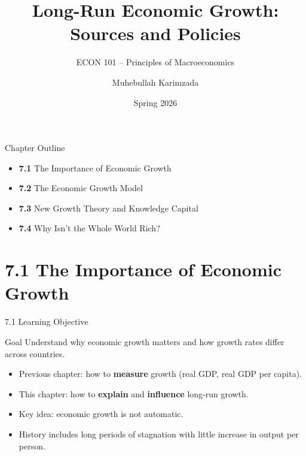 \documentclass[aspectratio=169]{beamer}
\title{\textbf{Long-Run Economic Growth: Sources and Policies}}
\subtitle{{\large ECON 101 -- Principles of Macroeconomics}}
\author{Muhebullah Karimzada}
\date{Spring 2026}
\begin{document}

\begin{frame}[plain]
  \titlepage
\end{frame}

\begin{frame}{Chapter Outline}
\transfade
\begin{itemize}[<+->]
  \item \textbf{7.1} The Importance of Economic Growth
  \item \textbf{7.2} The Economic Growth Model
  \item \textbf{7.3} New Growth Theory and Knowledge Capital
  \item \textbf{7.4} Why Isn't the Whole World Rich?
\end{itemize}
\end{frame}

\section{7.1 The Importance of Economic Growth}

\begin{frame}{7.1 Learning Objective}
\transfade
\begin{block}{Goal}
Understand why economic growth matters and how growth rates differ across countries.
\end{block}
\begin{itemize}[<+->]
  \item Previous chapter: how to \textbf{measure} growth (real GDP, real GDP per capita).
  \item This chapter: how to \textbf{explain} and \textbf{influence} long-run growth.
  \item Key idea: economic growth is \alert{not automatic}.
  \item History includes long periods of stagnation with little increase in output per person.
\end{itemize}
\end{frame}
\end{document}
